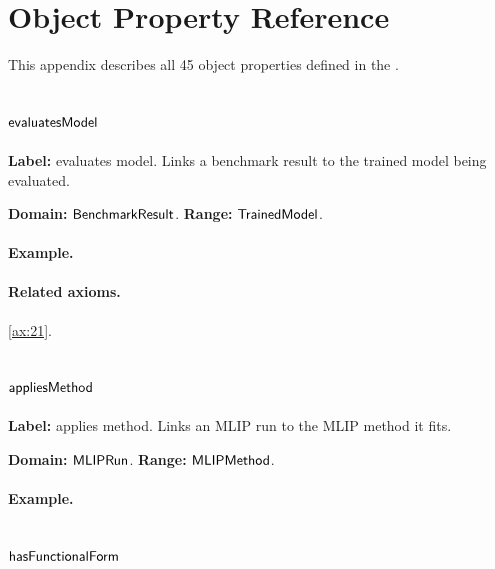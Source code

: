 \section{Object Property Reference}
\label{sec:object-property-reference}

This appendix describes all 45 object properties defined in the \MLIPsOntology{}.

\subsection{$\mathsf{evaluatesModel}$}
\label{sec:term-evaluatesModel}

\textbf{Label:} evaluates model.
Links a benchmark result to the trained model being evaluated.

\textbf{Domain:} $\mathsf{BenchmarkResult}$.
\textbf{Range:} $\mathsf{TrainedModel}$.

\paragraph{Example.}

\paragraph{Related axioms.} \eqref{ax:21}.

\subsection{$\mathsf{appliesMethod}$}
\label{sec:term-appliesMethod}

\textbf{Label:} applies method.
Links an MLIP run to the MLIP method it fits.

\textbf{Domain:} $\mathsf{MLIPRun}$.
\textbf{Range:} $\mathsf{MLIPMethod}$.

\paragraph{Example.}

\subsection{$\mathsf{hasFunctionalForm}$}
\label{sec:term-hasFunctionalForm}

